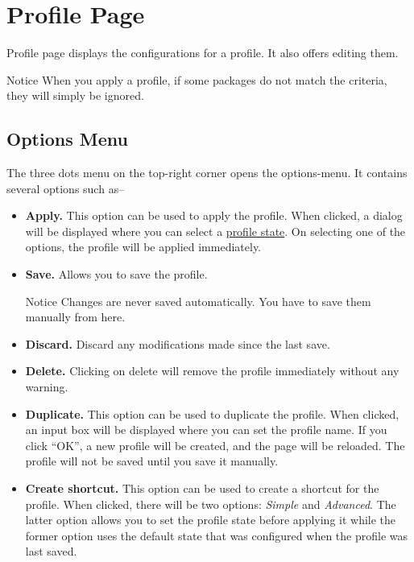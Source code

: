 \section{Profile Page}\label{sec:profile-page} %
Profile page displays the configurations for a profile. It also offers editing them.

\begin{tip}{Notice}
    When you apply a profile, if some packages do not match the criteria, they will simply be ignored.
\end{tip}

\subsection{Options Menu}\label{subsec:profile-options-menu} %
The three dots menu on the top-right corner opens the options-menu. It contains several options such as--
\begin{itemize}
    \item \textbf{Apply.} This option can be used to apply the profile. When clicked, a dialog will be displayed where
    you can select a \hyperref[subsubsec:profile-state]{profile state}. On selecting one of the options, the profile
    will be applied immediately.
    \item \textbf{Save.} Allows you to save the profile.
    \begin{warning}{Notice}
        Changes are never saved automatically. You have to save them manually from here.
    \end{warning}
    \item \textbf{Discard.} Discard any modifications made since the last save.
    \item \textbf{Delete.} Clicking on delete will remove the profile immediately without any warning.
    \item \textbf{Duplicate.} This option can be used to duplicate the profile. When clicked, an input box will be
    displayed where you can set the profile name. If you click ``OK'', a new profile will be created, and the page will be
    reloaded. The profile will not be saved until you save it manually.
    \item \textbf{Create shortcut.} This option can be used to create a shortcut for the profile. When clicked, there
    will be two options: \textit{Simple} and \textit{Advanced}. The latter option allows you to set the profile state
    before applying it while the former option uses the default state that was configured when the profile was last saved.
\end{itemize}

